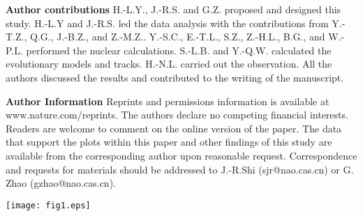 \documentclass[twoside,onecolumnm,12pt]{article}
\newcommand{\starname}{TYC\,$429$-$2097$-$1$}
\newcommand\ion[2]{#1$\;${\scriptsize\rmfamily\uppercase\expandafter{\romannumeral#2}}\relax}
\begin{document}
\vspace{10pt}
\noindent \textbf{Author contributions} {H.-L.Y., J.-R.S. and G.Z. proposed and designed this study. H.-L.Y and J.-R.S. led the data analysis with the contributions from Y.-T.Z., Q.G., J.-B.Z., and Z.-M.Z.. Y.-S.C., E.-T.L., S.Z., Z.-H.L., B.G., and W.-P.L. performed the nuclear calculations. S.-L.B. and Y.-Q.W. calculated the evolutionary models and tracks. H.-N.L. carried out the observation. All the authors discussed the results and contributed to the writing of the manuscript.
}

\vspace{10pt}
\noindent \textbf{Author Information} {Reprints and permissions information is available at www.nature.com/reprints. The authors declare no competing financial interests. Readers are welcome to comment on the online version of the paper. The data that support the plots within this paper and other findings of this study are available from the corresponding author upon reasonable request. Correspondence and requests for materials should be addressed to J.-R.Shi (sjr@nao.cas.cn) or G. Zhao (gzhao@nao.cas.cn). }



\clearpage
\small
\begin{figure*}[!h]
\setlength{\abovecaptionskip}{-15pt}
\setlength{\belowcaptionskip}{-15pt}
\begin{center}
\texttt{[image: fig1.eps]}\\
\caption{The observed spectra and
line profile fittings for \starname. The
low-resolution spectrum from LAMOST is shown in panel (a), where
H$\alpha$ line and \ion{Li}{1} resonance
line are indicated. Panels (b) and (e)
display the high-resolution spectrum (blue dot)
observed by APF near 6708\,\AA\ and 6103\,\AA, respectively.
The spectrum of HD\,48381 is also plotted (green
dots) for comparison in both panel. The best
profile fittings for these two lines are indicated
with the red solid line in panels (c) and (d), respectively, where
several profiles computed with different Li abundances
are also presented. The profile from LTE
calculation reaches saturation (cyan curve) in panel (c), and
increasing Li abundance will barely affect the computed profile,
therefore the LTE abundance shown in panel (c) is estimated from the
equivalent width of this line.}\label{fig1}
\end{center}
\end{figure*}
\end{document}
